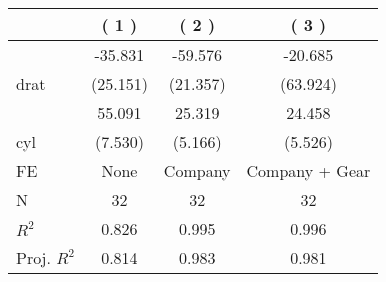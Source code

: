 
\begin{tabular}{lccc}
\toprule
 & ( 1 ) & ( 2 ) & ( 3 )\\
\midrule
 & -35.831 & -59.576 & -20.685\\

\multirow{-2}{*}{\raggedright\arraybackslash drat} & (25.151) & (21.357) & (63.924)\\

 & 55.091 & 25.319 & 24.458\\

\multirow{-2}{*}{\raggedright\arraybackslash cyl} & (7.530) & (5.166) & (5.526)\\

\midrule
FE & None & Company & Company + Gear\\

\midrule
N & 32 & 32 & 32\\

$R^2$ & 0.826 & 0.995 & 0.996\\

Proj. $R^2$ & 0.814 & 0.983 & 0.981\\
\bottomrule
\end{tabular}
